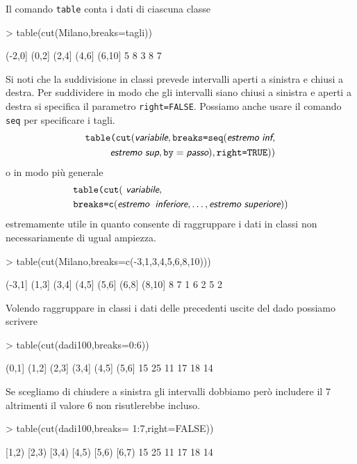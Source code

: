 \documentclass[onecolumn,12pt]{book}
\newcommand{\varia}[1]{\textsl{\textsf{#1}}}
\begin{document}
Il comando \texttt{table} conta i dati di ciascuna classe

\begin{Schunk}
\begin{Sinput}
> table(cut(Milano,breaks=tagli))
\end{Sinput}
\begin{Soutput}
(-2,0]  (0,2]  (2,4]  (4,6] (6,10] 
     5      8      3      8      7 
\end{Soutput}
\end{Schunk}
Si noti che la suddivisione in classi prevede intervalli aperti a sinistra e chiusi a destra.
Per suddividere in modo che gli intervalli siano chiusi a sinistra e aperti a destra si specifica il parametro \texttt{right=FALSE}.
Possiamo anche usare il comando \texttt{seq} per specificare i tagli.
 \begin{eqnarray*}
\texttt{table(cut}( \varia{variabile},\texttt{breaks=seq}(\varia{estremo inf},\\
\varia{estremo sup},\texttt{by}=\varia{passo}),\texttt{right=TRUE}))
\end{eqnarray*}
o in modo  pi\`u generale
\begin{eqnarray*}
&\texttt{table(cut}(\varia{ variabile},\\
&\texttt{breaks=c}(\varia{estremo\; inferiore}, \ldots,\varia{estremo superiore}))
\end{eqnarray*}
estremamente utile in quanto consente di raggruppare i dati in classi non necessariamente di ugual ampiezza.
\begin{Schunk}
\begin{Sinput}
> table(cut(Milano,breaks=c(-3,1,3,4,5,6,8,10)))
\end{Sinput}
\begin{Soutput}
(-3,1]  (1,3]  (3,4]  (4,5]  (5,6]  (6,8] (8,10] 
     8      7      1      6      2      5      2 
\end{Soutput}
\end{Schunk}
Volendo raggruppare in classi i dati delle precedenti uscite del dado possiamo scrivere
\begin{Schunk}
\begin{Sinput}
> table(cut(dadi100,breaks=0:6))
\end{Sinput}
\begin{Soutput}
(0,1] (1,2] (2,3] (3,4] (4,5] (5,6] 
   15    25    11    17    18    14 
\end{Soutput}
\end{Schunk}
Se scegliamo di chiudere a sinistra gli intervalli dobbiamo però includere il 7 altrimenti 
il valore 6 non risutlerebbe incluso.
\begin{Schunk}
\begin{Sinput}
> table(cut(dadi100,breaks= 1:7,right=FALSE))
\end{Sinput}
\begin{Soutput}
[1,2) [2,3) [3,4) [4,5) [5,6) [6,7) 
   15    25    11    17    18    14 
\end{Soutput}
\end{Schunk}
\end{document}
